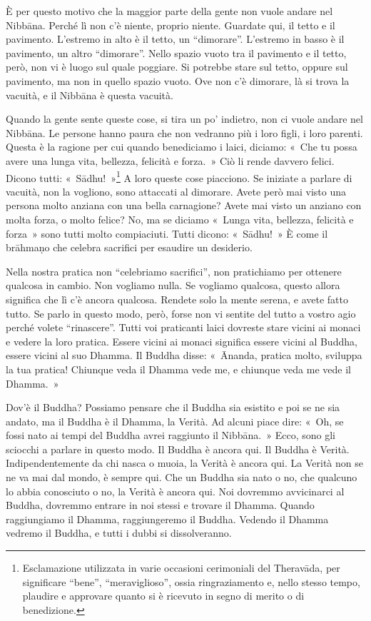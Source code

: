 È per questo motivo che la maggior parte della gente non vuole andare
nel Nibbāna. Perché lì non c'è niente, proprio niente. Guardate
qui, il tetto e il pavimento. L'estremo in alto è il tetto, un
``dimorare''. L'estremo in basso è il pavimento, un altro ``dimorare''.
Nello spazio vuoto tra il pavimento e il tetto, però, non vi è luogo sul
quale poggiare. Si potrebbe stare sul tetto, oppure sul pavimento, ma
non in quello spazio vuoto. Ove non c'è dimorare, là si trova la
vacuità, e il Nibbāna è questa vacuità.

Quando la gente sente queste cose, si tira un po' indietro, non ci vuole
andare nel Nibbāna. Le persone hanno paura che non vedranno più i
loro figli, i loro parenti. Questa è la ragione per cui quando
benediciamo i laici, diciamo: «~Che tu possa avere una lunga vita,
bellezza, felicità e forza.~» Ciò li rende davvero felici. Dicono tutti:
«~Sādhu!~»\footnote{Esclamazione utilizzata in varie occasioni
  cerimoniali del Theravāda, per significare ``bene'', ``meraviglioso'',
  ossia ringraziamento e, nello stesso tempo, plaudire e approvare
  quanto si è ricevuto in segno di merito o di benedizione.} A loro
queste cose piacciono. Se iniziate a parlare di vacuità, non la
vogliono, sono attaccati al dimorare. Avete però mai visto una persona
molto anziana con una bella carnagione? Avete mai visto un anziano con
molta forza, o molto felice? No, ma se diciamo «~Lunga vita, bellezza,
felicità e forza~» sono tutti molto compiaciuti. Tutti dicono:
«~Sādhu!~» È come il brāhmaṇo che celebra sacrifici per esaudire un
desiderio.

Nella nostra pratica non ``celebriamo sacrifici'', non pratichiamo per
ottenere qualcosa in cambio. Non vogliamo nulla. Se vogliamo qualcosa,
questo allora significa che lì c'è ancora qualcosa. Rendete solo la
mente serena, e avete fatto tutto. Se parlo in questo modo, però, forse
non vi sentite del tutto a vostro agio perché volete ``rinascere''.
Tutti voi praticanti laici dovreste stare vicini ai monaci e vedere la
loro pratica. Essere vicini ai monaci significa essere vicini al Buddha,
essere vicini al suo Dhamma. Il Buddha disse: «~Ānanda, pratica molto,
sviluppa la tua pratica! Chiunque veda il Dhamma vede me, e chiunque
veda me vede il Dhamma.~»

Dov'è il Buddha? Possiamo pensare che il Buddha sia esistito e poi se ne
sia andato, ma il Buddha è il Dhamma, la Verità. Ad alcuni piace dire:
«~Oh, se fossi nato ai tempi del Buddha avrei raggiunto il
Nibbāna.~» Ecco, sono gli sciocchi a parlare in questo
modo. Il Buddha è ancora qui. Il Buddha è Verità. Indipendentemente da
chi nasca o muoia, la Verità è ancora qui. La Verità non se ne va mai
dal mondo, è sempre qui. Che un Buddha sia nato o no, che qualcuno lo
abbia conosciuto o no, la Verità è ancora qui. Noi dovremmo avvicinarci
al Buddha, dovremmo entrare in noi stessi e trovare il Dhamma. Quando
raggiungiamo il Dhamma, raggiungeremo il Buddha. Vedendo il Dhamma
vedremo il Buddha, e tutti i dubbi si dissolveranno.

